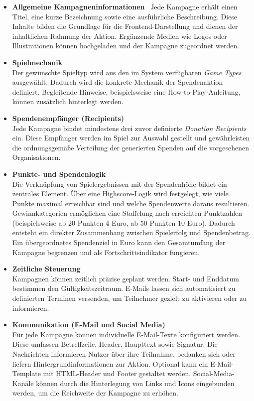 \begin{itemize}
\item \textbf{Allgemeine Kampagneninformationen} \
Jede Kampagne erhält einen Titel, eine kurze Bezeichnung sowie eine ausführliche Beschreibung. Diese Inhalte bilden die Grundlage für die Frontend-Darstellung und dienen der inhaltlichen Rahmung der Aktion. Ergänzende Medien wie Logos oder Illustrationen können hochgeladen und der Kampagne zugeordnet werden.
\item \textbf{Spielmechanik} \\
Der gewünschte Spieltyp wird aus den im System verfügbaren \textit{Game Types} ausgewählt. Dadurch wird die konkrete Mechanik der Spendenaktion definiert. Begleitende Hinweise, beispielsweise eine How-to-Play-Anleitung, können zusätzlich hinterlegt werden.

\item \textbf{Spendenempfänger (Recipients)} \\
Jede Kampagne bindet mindestens drei zuvor definierte \textit{Donation Recipients} ein. Diese Empfänger werden im Spiel zur Auswahl gestellt und gewährleisten die ordnungsgemäße Verteilung der generierten Spenden auf die vorgesehenen Organisationen.

\item \textbf{Punkte- und Spendenlogik} \\
Die Verknüpfung von Spielergebnissen mit der Spendenhöhe bildet ein zentrales Element. Über eine Highscore-Logik wird festgelegt, wie viele Punkte maximal erreichbar sind und welche Spendenwerte daraus resultieren. Gewinnkategorien ermöglichen eine Staffelung nach erreichten Punktzahlen (beispielsweise ab 20 Punkten 4 Euro, ab 50 Punkten 10 Euro). Dadurch entsteht ein direkter Zusammenhang zwischen Spielerfolg und Spendenbetrag. Ein übergeordnetes Spendenziel in Euro kann den Gesamtumfang der Kampagne begrenzen und als Fortschrittsindikator fungieren.

\item \textbf{Zeitliche Steuerung} \\
Kampagnen können zeitlich präzise geplant werden. Start- und Enddatum bestimmen den Gültigkeitszeitraum. E-Mails lassen sich automatisiert zu definierten Terminen versenden, um Teilnehmer gezielt zu aktivieren oder zu informieren.

\item \textbf{Kommunikation (E-Mail und Social Media)} \\
Für jede Kampagne können individuelle E-Mail-Texte konfiguriert werden. Diese umfassen Betreffzeile, Header, Haupttext sowie Signatur. Die Nachrichten informieren Nutzer über ihre Teilnahme, bedanken sich oder liefern Hintergrundinformationen zur Aktion. Optional kann ein E-Mail-Template mit HTML-Header und Footer gestaltet werden. Social-Media-Kanäle können durch die Hinterlegung von Links und Icons eingebunden werden, um die Reichweite der Kampagne zu erhöhen.


\end{itemize}

